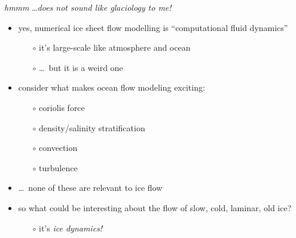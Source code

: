 \begin{frame}{\emph{hmmm} \dots \emph{does not sound like glaciology to me!}}

\begin{itemize}
\item \alert{yes}, numerical ice sheet flow modelling is ``computational fluid dynamics''
  \begin{itemize}
  \item[$\circ$] it's large-scale like atmosphere and ocean
  \item[$\circ$] \dots\, but it is a weird one
  \end{itemize}
\item consider what makes ocean flow modeling exciting:
  \begin{itemize}
  \item[$\circ$] coriolis force
  \item[$\circ$] density/salinity stratification
  \item[$\circ$] convection
  \item[$\circ$] turbulence
  \end{itemize}
\item \dots\, none of these are relevant to ice flow
\item so what could be interesting about the flow of slow, cold, laminar, old ice?
  \begin{itemize}
  \item[$\circ$] it's \emph{ice dynamics!}
  \end{itemize}
\end{itemize}
\end{frame}


